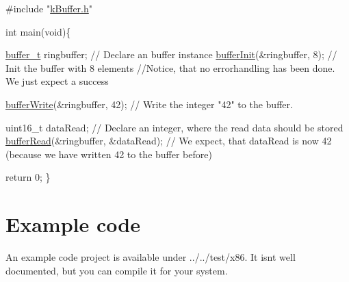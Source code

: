 \begin{DoxyCode}
\textcolor{preprocessor}{#include "\hyperlink{k_buffer_8h}{kBuffer.h}"}

\textcolor{keywordtype}{int} main(\textcolor{keywordtype}{void})\{

 \hyperlink{structbuffer__t}{buffer\_t} ringbuffer;                \textcolor{comment}{// Declare an buffer instance}
 \hyperlink{k_buffer_8c_aec18d6ea571b1326dbeb7ca15f4969c0}{bufferInit}(&ringbuffer, 8);         \textcolor{comment}{// Init the buffer with 8 elements}
 \textcolor{comment}{//Notice, that no errorhandling has been done. We just expect a success}
 
 \hyperlink{k_buffer_8c_a9d6410a89adf65a3ef12340ecb9bbd55}{bufferWrite}(&ringbuffer, 42);       \textcolor{comment}{// Write the integer "42" to the buffer.}

 uint16\_t dataRead;                  \textcolor{comment}{// Declare an integer, where the read data should be stored}
 \hyperlink{k_buffer_8c_a9b80be9033ccd6b5a101f811520ab4cc}{bufferRead}(&ringbuffer, &dataRead); \textcolor{comment}{// We expect, that dataRead is now 42 (because we have
       written 42 to the buffer before)}

 \textcolor{keywordflow}{return} 0;
\}
\end{DoxyCode}
 \hypertarget{index_example}{}\section{Example code}\label{index_example}
An example code project is available under ../../test/x86. It isn\textquotesingle{}t well documented, but you can compile it for your system. 